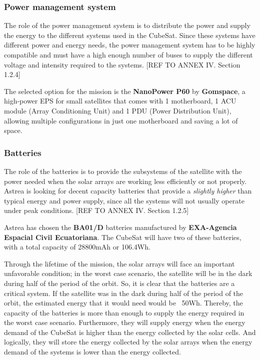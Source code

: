 \subsubsection{Power management system}
The role of the power management system is to distribute the power and supply the energy to the different systems used in the CubeSat. Since these systems have different power and energy needs, the power management system has to be highly compatible and must have a high enough number of buses to supply the different voltage and intensity required to the systems. [{REF TO ANNEX IV. Section 1.2.4}]

The selected option for the mission is the \textbf{NanoPower P60} by \textbf{Gomspace}, a high-power EPS for small satellites that comes with 1 motherboard, 1 ACU module (Array Conditioning Unit) and 1 PDU (Power Distribution Unit), allowing multiple configurations in just one motherboard and saving a lot of space.


\subsubsection{Batteries}
The role of the batteries is to provide the subsystems of the satellite with the power needed when the solar arrays are working less efficiently or not properly. Astrea is looking for decent capacity batteries that provide a \textit{slightly higher} than typical energy and power supply, since all the systems will not usually operate under peak conditions. [{REF TO ANNEX IV. Section 1.2.5}]

Astrea has chosen the \textbf{BA01/D} batteries manufactured by \textbf{EXA-Agencia Espacial Civil Ecuatoriana}. The CubeSat will have two of these batteries, with a total capacity of 28800mAh or 106.4Wh.

Through the lifetime of the mission, the solar arrays will face an important unfavorable condition; in the worst case scenario, the satellite will be in the dark during half of the period of the orbit. So, it is clear that the batteries are a critical system. If the satellite was in the dark during half of the period of the orbit, the estimated energy that it would need would be ~50Wh. Thereby, the capacity of the batteries is more than enough to supply the energy required in the worst case scenario. Furthermore, they will supply energy when the energy demand of the CubeSat is higher than the energy collected by the solar cells. And logically, they will store the energy collected by the solar arrays when the energy demand of the systems is lower than the energy collected.

